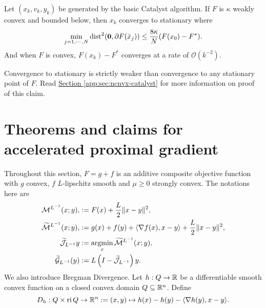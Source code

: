 \documentclass[12pt]{article}
\begin{document}
    \begin{theorem}\label{thm:basic-4wd-catalyst}
        Let $(x_k, v_k, y_k)$ be generated by the basic Catalyst algorithm. 
        If $F$ is $\kappa$ weakly convex and bounded below, then $x_k$ converges to stationary where
        \begin{align*}
            \min_{j = 1, \cdots, N} \operatorname{dist}^2(\mathbf 0, \partial F(\bar x_j))
            \le \frac{8 \kappa}{N}(F(x_0) - F^*). 
        \end{align*}
        And when $F$ is convex, $F(x_k) - F^*$ converges at a rate of $\mathcal O(k^{-2})$. 
    \end{theorem}
    \begin{remark}
        Convergence to stationary is strictly weaker than convergence to any stationary point of $F$. 
        Read 
        \hyperref[app:sec:ncnvx-catalyst]{Section \ref*{app:sec:ncnvx-catalyst}} for more information on proof of this claim. 
    \end{remark}





\newpage

\appendix
\section{Theorems and claims for accelerated proximal gradient}\label{app:sec:thm-claim-acc-prox-grad}
    Throughout this section, $F = g + f$ is an additive composite objective function with $g$ convex, $f$ $L$-lipschitz smooth and $\mu \ge0$ strongly convex. 
    The notations here are 
    \begin{align*}
        \mathcal M^{L^{-1}}(x; y),
        &:= 
        F(x) + \frac{L}{2}\Vert x - y\Vert^2,
        \\
        \widetilde{ \mathcal M}^{L^{-1}}(x; y) ,
        &:= g(x) + f(y) 
        + 
        \left\langle \nabla f(x), x - y\right\rangle 
        + 
        \frac{L}{2}\Vert x - y\Vert^2,
        \\
        \widetilde{\mathcal J}_{L^{-1}}y 
        &:= \mathop{\rm argmin}\limits_{x} \widetilde{\mathcal M}^{L^{-1}}(x; y),
        \\
        \widetilde{\mathcal G}_{L^{-1}}(y)
        &:= L\left(I - \widetilde{\mathcal J}_{L^{-1}}\right)y. 
    \end{align*}
    We also introduce Bregman Divergence. 
    Let $h: Q \rightarrow \mathbb R$ be a differentiable smooth convex function on a closed convex domain $Q \subseteq \mathbb R^n$.
    Define 
    $$
        D_h: Q \times \operatorname{ri} Q \rightarrow \mathbb R^n
        := (x, y) \mapsto h(x) - h(y) - \langle \nabla h(y), x - y\rangle. 
    $$
\end{document}
